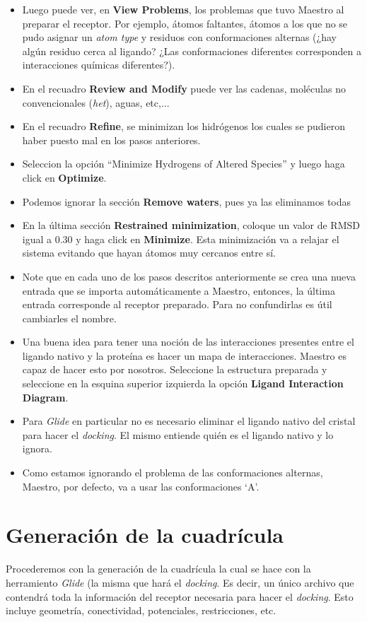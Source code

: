 \documentclass{article}
\begin{document}
\begin{itemize}
    \item Luego puede ver, en \textbf{View Problems}, los problemas que tuvo Maestro al preparar el receptor. Por ejemplo, átomos faltantes, átomos a los que no se pudo asignar un \emph{atom type} y residuos con conformaciones alternas (¿hay algún residuo cerca al ligando? ¿Las conformaciones diferentes corresponden a interacciones químicas diferentes?).
    \item En el recuadro \textbf{Review and Modify} puede ver las cadenas, moléculas no convencionales (\emph{het}), aguas, etc,...
    \item En el recuadro \textbf{Refine}, se minimizan los hidrógenos los cuales se pudieron haber puesto mal en los pasos anteriores.
    \item Seleccion la opción ``Minimize Hydrogens of Altered Species'' y luego haga click en \textbf{Optimize}.
    \item Podemos ignorar la sección \textbf{Remove waters}, pues ya las eliminamos todas
    \item En la última sección \textbf{Restrained minimization}, coloque un valor de RMSD igual a 0.30 y haga click en \textbf{Minimize}. Esta minimización va a relajar el sistema evitando que hayan átomos muy cercanos entre sí.
    \item Note que en cada uno de los pasos descritos anteriormente se crea una nueva entrada que se importa automáticamente a Maestro, entonces, la última entrada corresponde al receptor preparado. Para no confundirlas es útil cambiarles el nombre.
    \item Una buena idea para tener una noción de las interacciones presentes entre el ligando nativo y la proteína es hacer un mapa de interacciones. Maestro es capaz de hacer esto por nosotros. Seleccione la estructura preparada y seleccione en la esquina superior izquierda la opción \textbf{Ligand Interaction Diagram}.
    \item Para \emph{Glide} en particular no es necesario eliminar el ligando nativo del cristal para hacer el \emph{docking}. El mismo entiende quién es el ligando nativo y lo ignora.
    \item Como estamos ignorando el problema de las conformaciones alternas, Maestro, por defecto, va a usar las conformaciones `A'.
    
\end{itemize}

\section{Generación de la cuadrícula}
\label{grid}
Procederemos con la generación de la cuadrícula la cual se hace con la herramiento \emph{Glide} (la misma que hará el \emph{docking}. Es decir, un único archivo que contendrá toda la información del receptor necesaria para hacer el \emph{docking}. Esto incluye geometría, conectividad, potenciales, restricciones, etc.
\end{document}

